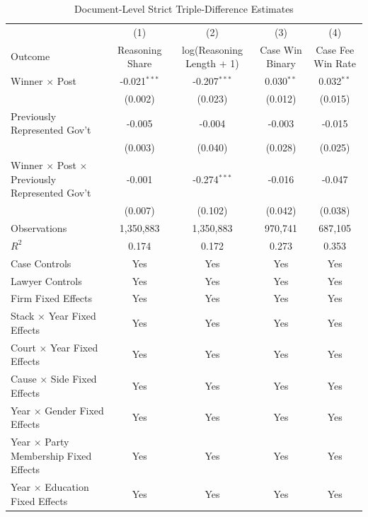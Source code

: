 \begin{table}[!htbp]
\setlength{\abovecaptionskip}{0pt}
\centering
\caption{Document-Level Strict Triple-Difference Estimates}
\label{tab:document_level_strict_ddd_main}
\begin{threeparttable}
\begin{tabular}{lcccc}
\toprule
 & (1) & (2) & (3) & (4) \\
Outcome & Reasoning Share & log(Reasoning Length + 1) & Case Win Binary & Case Fee Win Rate \\
\midrule
Winner $\times$ Post & -0.021$^{***}$ & -0.207$^{***}$ & 0.030$^{**}$ & 0.032$^{**}$ \\
 & (0.002) & (0.023) & (0.012) & (0.015) \\
\addlinespace
Previously Represented Gov't & -0.005 & -0.004 & -0.003 & -0.015 \\
 & (0.003) & (0.040) & (0.028) & (0.025) \\
\addlinespace
Winner $\times$ Post $\times$ Previously Represented Gov't & -0.001 & -0.274$^{***}$ & -0.016 & -0.047 \\
 & (0.007) & (0.102) & (0.042) & (0.038) \\
\addlinespace
Observations & 1,350,883 & 1,350,883 & 970,741 & 687,105 \\
$R^2$ & 0.174 & 0.172 & 0.273 & 0.353 \\
Case Controls & Yes & Yes & Yes & Yes \\
Lawyer Controls & Yes & Yes & Yes & Yes \\
Firm Fixed Effects & Yes & Yes & Yes & Yes \\
Stack $\times$ Year Fixed Effects & Yes & Yes & Yes & Yes \\
Court $\times$ Year Fixed Effects & Yes & Yes & Yes & Yes \\
Cause $\times$ Side Fixed Effects & Yes & Yes & Yes & Yes \\
Year $\times$ Gender Fixed Effects & Yes & Yes & Yes & Yes \\
Year $\times$ Party Membership Fixed Effects & Yes & Yes & Yes & Yes \\
Year $\times$ Education Fixed Effects & Yes & Yes & Yes & Yes \\
\bottomrule
\end{tabular}
\begin{tablenotes}[flushleft]
\footnotesize

\end{tablenotes}
\end{threeparttable}
\end{table}
